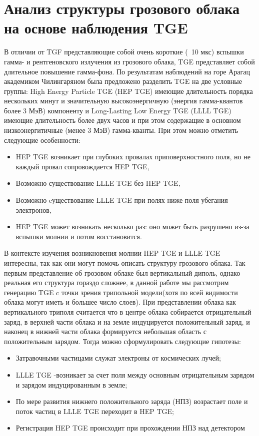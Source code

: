 \section{Анализ структуры грозового облака на основе наблюдения TGE}
В отличии от TGF представляющие собой очень короткие (~10 мкс) вспышки гамма- и рентгеновского излучения из грозового облака, TGE представляет собой длительное повышение гамма-фона. По результатам наблюдений на горе Арагац академиком Чилингаряном была предложено разделить TGE на две условные группы: 
High Energy Particle TGE (HEP TGE) имеющие длительность порядка нескольких минут и значительную высокоэнергичную (энергия гамма-квантов более 3 МэВ) компоненту и Long-Lasting Low Energy TGE (LLLL TGE) имеющие длительность более двух часов и при этом содержащие в основном низкоэнергитичные (менее 3 МэВ) гамма-кванты. При этом можно отметить следующие особенности: 
\begin{itemize}
    \item HEP TGE  возникает при глубоких  провалах  приповерхностного поля, но не каждый провал сопровождается HEP TGE,
    \item Возможно существование LLLE TGE без  HEP TGE,
    \item Возможно cуществование LLLE TGE при полях ниже поля убегания электронов,
    \item HEP TGE может возникать несколько раз: оно может быть разрушено из-за вспышки молнии и потом восстановится.
\end{itemize}
В контексте изучения возникновения молнии HEP TGE и LLLE TGE интересны, так как они могут помочь описать структуру грозового облака.  Так первым представление об грозовом облаке был вертикальный диполь, однако реальная его структура гораздо сложнее, в данной работе мы рассмотрим генерацию TGE c точки зрения трипольной модели(хотя по всей видимости облака могут иметь и большее число слоев). При представлении облака как вертикального триполя считается что в центре облака собирается отрицательный заряд, в верхней части облака и на земле индуцируется положительный заряд, и наконец в нижней части облака формируется небольшая область с положительным зарядом. Тогда можно сформулировать следующие гипотезы:
\begin{itemize}
    \item Затравочными частицами служат электроны от космических лучей;
    \item LLLE TGE -возникает за счет поля между основным отрицательным зарядом и зарядом индуцированным в земле;
    \item По мере развития нижнего положительного заряда (НПЗ)  возрастает поле и поток частиц в LLLE TGE переходит в HEP TGE;
    \item Регистрация HEP TGE происходит при прохождении НПЗ над детектором
\end{itemize}
